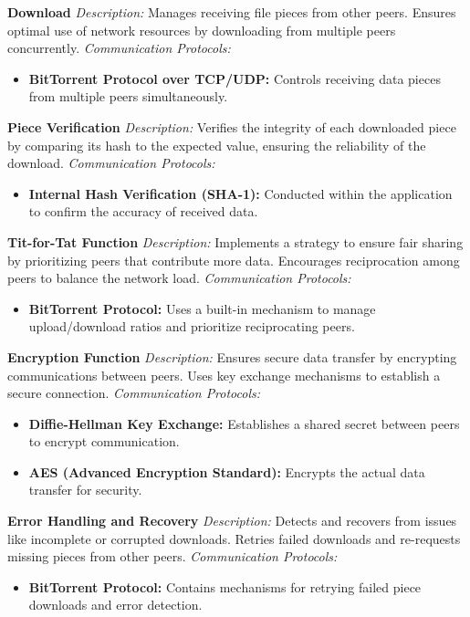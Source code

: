 \documentclass[a4paper]{article}
\begin{document}
    \textbf{Download}  
    \textit{Description:} Manages receiving file pieces from other peers. Ensures optimal use of network resources by downloading from multiple peers concurrently.  
    \textit{Communication Protocols:}
    \begin{itemize}
        \item \textbf{BitTorrent Protocol over TCP/UDP:} Controls receiving data pieces from multiple peers simultaneously.
    \end{itemize}

    \textbf{Piece Verification}  
    \textit{Description:} Verifies the integrity of each downloaded piece by comparing its hash to the expected value, ensuring the reliability of the download.  
    \textit{Communication Protocols:}
    \begin{itemize}
        \item \textbf{Internal Hash Verification (SHA-1):} Conducted within the application to confirm the accuracy of received data.
    \end{itemize}

    \textbf{Tit-for-Tat Function}  
    \textit{Description:} Implements a strategy to ensure fair sharing by prioritizing peers that contribute more data. Encourages reciprocation among peers to balance the network load.  
    \textit{Communication Protocols:}
    \begin{itemize}
        \item \textbf{BitTorrent Protocol:} Uses a built-in mechanism to manage upload/download ratios and prioritize reciprocating peers.
    \end{itemize}

    \textbf{Encryption Function}  
    \textit{Description:} Ensures secure data transfer by encrypting communications between peers. Uses key exchange mechanisms to establish a secure connection.  
    \textit{Communication Protocols:}
    \begin{itemize}
        \item \textbf{Diffie-Hellman Key Exchange:} Establishes a shared secret between peers to encrypt communication.
        \item \textbf{AES (Advanced Encryption Standard):} Encrypts the actual data transfer for security.
    \end{itemize}

    \textbf{Error Handling and Recovery}  
    \textit{Description:} Detects and recovers from issues like incomplete or corrupted downloads. Retries failed downloads and re-requests missing pieces from other peers.  
    \textit{Communication Protocols:}
    \begin{itemize}
        \item \textbf{BitTorrent Protocol:} Contains mechanisms for retrying failed piece downloads and error detection.
    \end{itemize}
\end{document}
